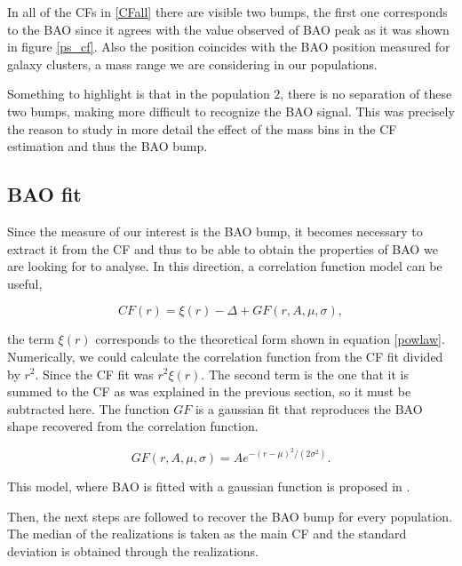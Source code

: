 In all of the CFs in \ref{CFall} there are visible two bumps, the first one
corresponds to the BAO since it agrees with the value observed of BAO
peak as it was shown in figure \ref{ps_cf}.
Also the position coincides with the BAO position measured for galaxy clusters, 
a mass range we are considering in our populations. 

Something to highlight is that in the population $2$, 
there is no separation of these two bumps, making more difficult to recognize the BAO signal. 
This was precisely the reason to study in more detail the effect of the mass bins in the CF estimation 
and thus the BAO bump. 


\subsection{BAO fit}

Since the measure of our interest is the BAO bump, it becomes necessary
to extract it from the CF and thus to be able to obtain the properties of 
BAO we are looking for to analyse. In this direction, a correlation function 
model can be useful,  

\begin{equation}
CF(r) = \xi(r) - \Delta + GF(r,A,\mu,\sigma),
\end{equation}

the term $\xi(r)$ corresponds to the theoretical form shown in equation \ref{powlaw}.
Numerically, we could calculate the correlation function from the CF fit divided by $r^2$. 
Since the CF fit was $r^2\xi(r)$. 
The second term is the one that it is summed to the CF as was explained
in the previous section, so it must be subtracted here. 
The function $GF$ is a gaussian fit that reproduces the BAO shape recovered 
from the correlation function. 

\[GF(r,A,\mu,\sigma) = Ae^{-(r-\mu)^2/(2\sigma^2)}.\]

This model, where BAO is fitted with a gaussian function is proposed in \cite{motion}. 

Then, the next steps are followed to recover the BAO bump for every population. 
The median of the realizations is taken as the main CF and the standard
deviation is obtained through the realizations.

